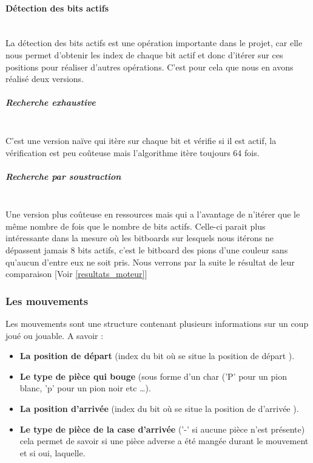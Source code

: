 \huge\documentclass{article}
\begin{document}
    \paragraph{Détection des bits actifs}
    ~~\\
    \newline
    La détection des bits actifs est une opération importante dans le projet, car elle nous permet d'obtenir les index de chaque bit actif et donc d'itérer sur ces positions pour réaliser d'autres opérations. C'est pour cela que nous en avons réalisé deux versions.
    \subparagraph{Recherche exhaustive} \label{recherche_bit_exhaustive}
    ~~\\
    \newline
    C'est une version naïve qui itère sur chaque bit et vérifie si il est actif, la vérification est peu coûteuse mais l'algorithme itère toujours 64 fois.
    \subparagraph{Recherche par soustraction} \label{recherche_bit_soustraction}
    ~~\\
    \newline
    Une version plus coûteuse en ressources mais qui a l'avantage de n'itérer que le même nombre de fois que le nombre de bits actifs. Celle-ci parait plus intéressante dans la mesure où les bitboards sur lesquels nous itérons ne dépassent jamais 8 bits actifs, c'est le bitboard des pions d'une couleur sans qu'aucun d'entre eux ne soit pris.\newline
    Nous verrons par la suite le résultat de leur comparaison [Voir \ref{resultats_moteur}]

    \subsubsection{Les mouvements}\label{Mouvements}
    Les mouvements sont une structure contenant plusieurs informations sur un coup joué ou jouable.
    A savoir :
    \begin{itemize}
        \item \textbf{La position de départ} (index du bit où se situe la position de départ ).
        \item \textbf{Le type de pièce qui bouge} (sous forme d'un char ('P' pour un pion blanc, 'p' pour un pion noir etc \dots).
        \item \textbf{La position d'arrivée}  (index du bit où se situe la position de d'arrivée ).
        \item \textbf{Le type de pièce de la case d'arrivée} ('-' si aucune pièce n'est présente) cela permet de savoir si une pièce adverse a été mangée durant le mouvement et si oui, laquelle.
    \end{itemize}
\end{document}
